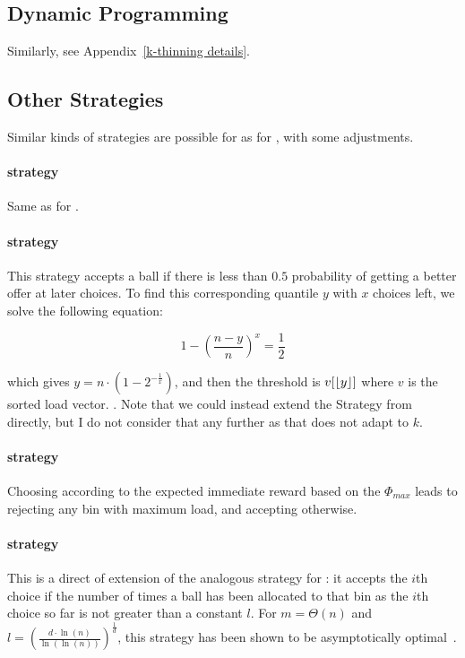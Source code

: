 \subsection{Dynamic Programming}

Similarly, see Appendix~\ref{k-thinning details}.


\subsection{Other Strategies}

Similar kinds of strategies are possible for \KThinning as for \TwoThinning, with some adjustments.

\paragraph{\AlwaysAccept strategy} Same as for \TwoThinning.


\paragraph{\Quantile strategy} This strategy accepts a ball if there is less than $0.5$ probability of getting a better offer at later choices. To find this corresponding quantile $y$ with $x$ choices left, we solve the following equation:

\begin{equation} \label{quantilekthinning}
1 - (\frac{n-y}{n})^x = \frac{1}{2}
\end{equation}

which gives $y = n \cdot  (1 - 2^{-\frac{1}{x}})$, and then the threshold is $v[\lfloor y\rfloor]$ where $v$ is the sorted load vector. . Note that we could instead extend the \MeanThinning Strategy from \TwoThinning directly, but I do not consider that any further as that does not adapt to $k$.


\paragraph{\LocalRewardOptimiser strategy} Choosing according to the expected immediate reward based on the $\Phi_{max}$ leads to rejecting any bin with maximum load, and accepting otherwise.


\paragraph{\Threshold strategy} This is a direct of extension of the analogous strategy for \TwoThinning: it accepts the $i$th choice if the number of times a ball has been allocated to that bin as the $i$th choice so far is not greater than a constant $l$. For $m=\Theta(n)$ and $l=\left(\frac{d\cdot\ln(n)}{\ln(\ln(n))}\right)^{\frac{1}{d}}$, this strategy has been shown to be asymptotically optimal~\cite{feldheim2020dthinning}.


